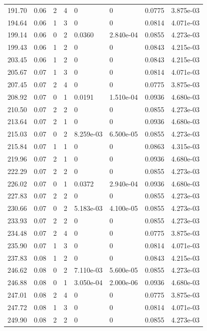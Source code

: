 \documentclass[preview]{standalone}
\begin{document}
{{{\begin{tabular}{L{1.2cm}C{1.2cm} C{0.3cm}C{0.5cm} C{1.4cm}C{1.4cm} C{1.4cm}C{1.4cm}}
  191.70  &  0.06  & 2     &  4 &  0  & 0  & 0.0775 &  3.875e-03   \\ 
  194.64  &  0.06  & 1     &  3 &  0  & 0  & 0.0814 &  4.071e-03   \\ 
  199.14  &  0.06  & 0     &  2 &  0.0360  & 2.840e-04  & 0.0855 &  4.273e-03   \\ 
  199.43  &  0.06  & 1     &  2 &  0  & 0  & 0.0843 &  4.215e-03   \\ 
  203.45  &  0.06  & 1     &  2 &  0  & 0  & 0.0843 &  4.215e-03   \\ 
  205.67  &  0.07  & 1     &  3 &  0  & 0  & 0.0814 &  4.071e-03   \\ 
  207.45  &  0.07  & 2     &  4 &  0  & 0  & 0.0775 &  3.875e-03   \\ 
  208.92  &  0.07  & 0     &  1 &  0.0191  & 1.510e-04  & 0.0936 &  4.680e-03   \\ 
  210.50  &  0.07  & 2     &  2 &  0  & 0  & 0.0855 &  4.273e-03   \\ 
  213.64  &  0.07  & 2     &  1 &  0  & 0  & 0.0936 &  4.680e-03   \\ 
  215.03  &  0.07  & 0     &  2 &  8.259e-03  & 6.500e-05  & 0.0855 &  4.273e-03   \\ 
  215.84  &  0.07  & 1     &  1 &  0  & 0  & 0.0863 &  4.315e-03   \\ 
  219.96  &  0.07  & 2     &  1 &  0  & 0  & 0.0936 &  4.680e-03   \\ 
  222.29  &  0.07  & 2     &  2 &  0  & 0  & 0.0855 &  4.273e-03   \\ 
  226.02  &  0.07  & 0     &  1 &  0.0372  & 2.940e-04  & 0.0936 &  4.680e-03   \\ 
  227.83  &  0.07  & 2     &  2 &  0  & 0  & 0.0855 &  4.273e-03   \\ 
  230.66  &  0.07  & 0     &  2 &  5.183e-03  & 4.100e-05  & 0.0855 &  4.273e-03   \\ 
  233.93  &  0.07  & 2     &  2 &  0  & 0  & 0.0855 &  4.273e-03   \\ 
  234.48  &  0.07  & 2     &  4 &  0  & 0  & 0.0775 &  3.875e-03   \\ 
  235.90  &  0.07  & 1     &  3 &  0  & 0  & 0.0814 &  4.071e-03   \\ 
  237.83  &  0.08  & 1     &  2 &  0  & 0  & 0.0843 &  4.215e-03   \\ 
  246.62  &  0.08  & 0     &  2 &  7.110e-03  & 5.600e-05  & 0.0855 &  4.273e-03   \\ 
  246.88  &  0.08  & 0     &  1 &  3.050e-04  & 2.000e-06  & 0.0936 &  4.680e-03   \\ 
  247.01  &  0.08  & 2     &  4 &  0  & 0  & 0.0775 &  3.875e-03   \\ 
  247.72  &  0.08  & 1     &  3 &  0  & 0  & 0.0814 &  4.071e-03   \\ 
  249.90  &  0.08  & 2     &  2 &  0  & 0  & 0.0855 &  4.273e-03   \\ 
\hline 
\end{tabular} 

}}}
\end{document}
